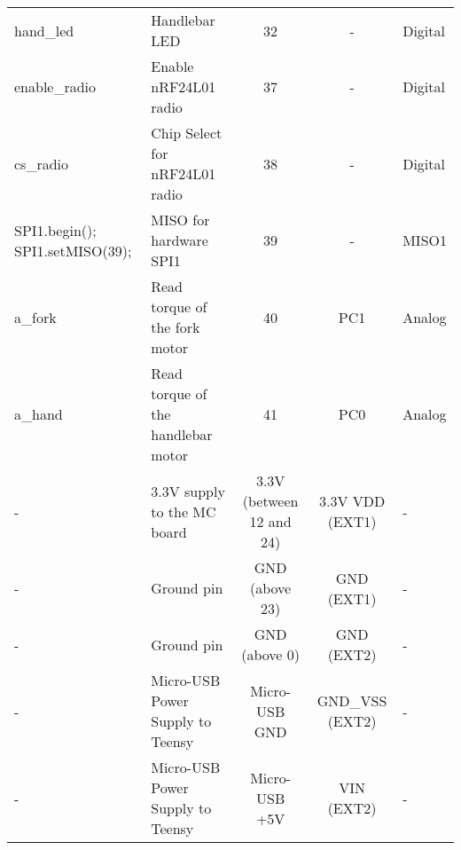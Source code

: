 \begin{table}
{\begin{tabular}{llccl}
hand\_led                                              & Handlebar LED                       & 32                      & -                     & Digital                                               \\
enable\_radio                                          & Enable nRF24L01 radio               & 37                      & -                     & Digital                                               \\
cs\_radio                                              & Chip Select for nRF24L01 radio      & 38                      & -                     & Digital                                               \\
SPI1.begin(); SPI1.setMISO(39);                        & MISO for hardware SPI1              & 39                      & -                     & MISO1                                                 \\
a\_fork                                                & Read torque of the fork motor       & 40                      & PC1                   & Analog                                                \\
a\_hand                                                & Read torque of the handlebar motor  & 41                      & PC0                   & Analog                                                \\
-                                                      & 3.3V supply to the MC board         & 3.3V (between 12 and 24)& 3.3V VDD (EXT1)       & -                                                     \\
-                                                      & Ground pin                          & GND (above 23)          & GND (EXT1)            & -                                                     \\
-                                                      & Ground pin                          & GND (above 0)           & GND (EXT2)            & -                                                     \\
-                                                      & Micro-USB Power Supply to Teensy    & Micro-USB GND           & GND\_VSS (EXT2)        & -                                                     \\
-                                                      & Micro-USB Power Supply to Teensy    & Micro-USB +5V           & VIN (EXT2)            & -                                                     \\
\bottomrule
\end{tabular}
}
\label{tab:teensy_mc}
\end{table}

